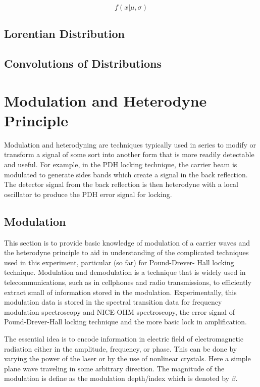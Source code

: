 \documentclass[11pt,a4paper]{book}
\begin{document}
		\begin{equation}
			f(x|\mu,\sigma)
		\end{equation}
		
		\subsection{Lorentian Distribution}
			\label{ssec:LorentianDistribution}
		
		\subsection{Convolutions of Distributions}
			\label{ssec:convolution}

	\section{Modulation and Heterodyne Principle}
		Modulation and heterodyning are techniques typically used in series to modify or transform a signal of some sort into another form that is more readily detectable and useful. For example, in the PDH locking technique, the carrier beam is modulated to generate sides bands which create a signal in the back reflection. The detector signal from the back reflection is then heterodyne with a local oscillator to produce the PDH error signal for locking.

		\subsection{Modulation}
			\label{ssec:Modulation}
			This section is to provide basic knowledge of modulation of a carrier waves and the heterodyne principle to aid in understanding of the complicated techniques used in this experiment, particular (so far) for Pound-Drever- Hall locking technique. Modulation and demodulation is a technique that is widely used in telecommunications, such as in cellphones and radio transmissions, to efficiently extract small of information stored in the modulation. Experimentally, this modulation data is stored in the spectral transition data for frequency modulation spectroscopy and NICE-OHM spectroscopy, the error signal of Pound-Drever-Hall locking technique and the more basic lock in amplification.
			
			The essential idea is to encode information in electric field of electromagnetic radiation either in the amplitude, frequency, or phase. This can be done by varying the power of the laser or by the use of nonlinear crystals. Here a simple plane wave traveling in some arbitrary direction. The magnitude of the modulation is define as the modulation depth/index which is denoted by $\beta$.
			
\end{document}
